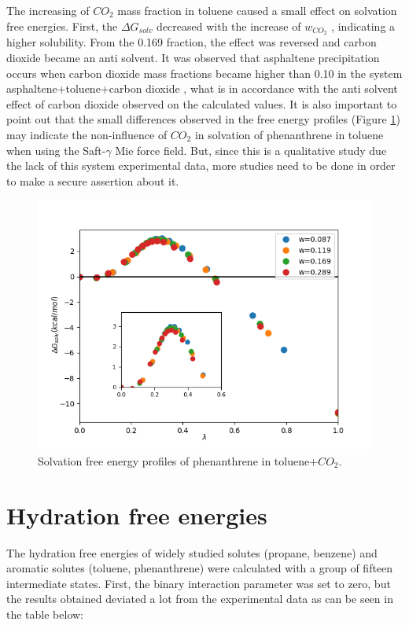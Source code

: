 The increasing of $CO_{2}$ mass fraction in toluene caused a small effect on solvation free energies. First, the $\Delta G_{solv}$ decreased with the increase of $w_{CO_{2}}$ , indicating a higher solubility. From the 0.169 fraction, the effect was reversed and carbon dioxide became an anti solvent. It was observed that asphaltene precipitation occurs when carbon dioxide mass fractions became higher than 0.10 in the system asphaltene+toluene+carbon dioxide \cite{SOROUSH2014405}, what is in accordance with the anti solvent effect of carbon dioxide observed on the calculated values. It is also important to point out that the small differences observed in the free energy profiles (Figure \ref{fig:Figure_1}) may indicate the non-influence of $CO_{2}$ in solvation of phenanthrene in toluene when using the Saft-$\gamma$ Mie force field. But, since this is a qualitative study due the lack of this system experimental data, more studies need to be done in order to make a secure assertion about it.   

\begin{figure}[H]
\centering
\includegraphics[width=0.9\linewidth]{Figures/Figure_1}
\caption{Solvation free energy profiles of phenanthrene in toluene+$CO_{2}$.}
\label{fig:Figure_1}
\end{figure}


\section{Hydration free energies}

The hydration free energies of widely studied solutes (propane, benzene) and aromatic solutes (toluene, phenanthrene) were calculated with a group of fifteen intermediate states. First, the binary interaction parameter was set to zero, but the results obtained deviated a lot from the experimental data as can be seen in the table below:

